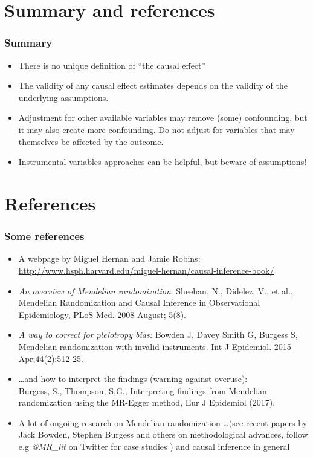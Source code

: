 \documentclass{beamer}
\begin{document}
\section{Summary and references}
\begin{frame}
\frametitle{Summary}
\begin{itemize}
\item There is no unique definition of ``the causal effect'' 
\item The validity of any causal effect estimates depends on the validity of the underlying assumptions.
\item Adjustment for other available variables may remove (some) confounding, but it may also create more confounding. \alert{Do not adjust for variables that may themselves be affected by the outcome.}   
\item Instrumental variables approaches can be helpful, but beware of assumptions! 
\end{itemize}
\end{frame}



\section{References}
\begin{frame}
\setlength{\textwidth}{1.2\textwidth}
\frametitle{Some references}
{\small
\begin{itemize}
\item A webpage by Miguel Hernan and Jamie Robins: 
\href{http://www.hsph.harvard.edu/miguel-hernan/causal-inference-book/}{http://www.hsph.harvard.edu/miguel-hernan/causal-inference-book/}
\item \textit{An overview of Mendelian randomization}: 
Sheehan, N., Didelez, V., et al., Mendelian Randomization and Causal Inference in Observational Epidemiology, PLoS Med. 2008 August; 5(8). 
\item \textit{A way to correct for pleiotropy bias:} 
Bowden J, Davey Smith G, Burgess S, Mendelian randomization with invalid instruments. Int J Epidemiol. 2015 Apr;44(2):512-25.
\item \ldots and how to interpret the findings (warning against overuse): \\ Burgess, S., Thompson, S.G., Interpreting findings from Mendelian randomization using the MR-Egger method, Eur J Epidemiol (2017). 
\item A lot of ongoing research on Mendelian randomization \ldots (see recent papers by Jack Bowden, Stephen Burgess and others on methodological advances, follow e.g \textit{@MR\_lit} on Twitter for case studies ) and causal inference in general
\end{itemize}}
\end{frame}
\end{document}
